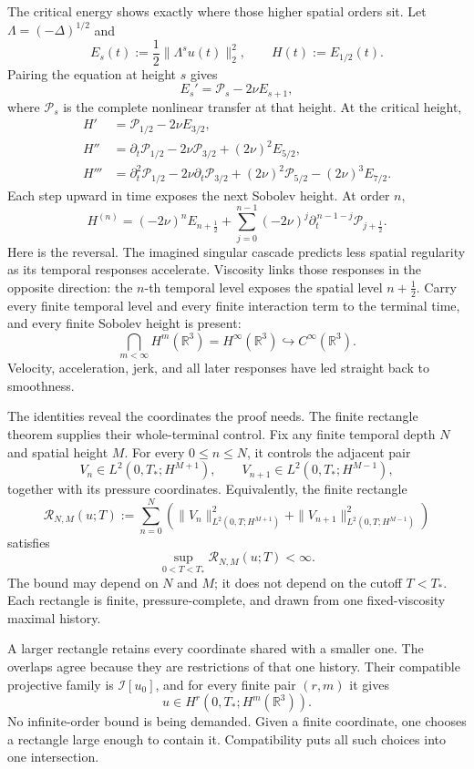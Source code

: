 \documentclass[12pt]{article}
\newcommand{\R}{\mathbb R}
\newcommand{\I}{\mathcal I}
\newcommand{\cR}{\mathcal R}
\begin{document}
The critical energy shows exactly where those higher spatial orders sit. Let
\(\Lambda=(-\Delta)^{1/2}\) and
\[
  E_s(t):=\frac12\|\Lambda^su(t)\|_2^2,
  \qquad
  H(t):=E_{1/2}(t).
\]
Pairing the equation at height \(s\) gives
\[
  E_s'=\mathcal P_s-2\nu E_{s+1},
\]
where \(\mathcal P_s\) is the complete nonlinear transfer at that height. At
the critical height,
\[
\begin{aligned}
  H'
  &=\mathcal P_{1/2}-2\nu E_{3/2},\\
  H''
  &=\partial_t\mathcal P_{1/2}
    -2\nu\mathcal P_{3/2}
    +(2\nu)^2E_{5/2},\\
  H'''
  &=\partial_t^2\mathcal P_{1/2}
    -2\nu\partial_t\mathcal P_{3/2}
    +(2\nu)^2\mathcal P_{5/2}
    -(2\nu)^3E_{7/2}.
\end{aligned}
\]
Each step upward in time exposes the next Sobolev height. At order \(n\),
\[
  H^{(n)}
  =
  (-2\nu)^nE_{n+\frac12}
  {}+
  \sum_{j=0}^{n-1}
  (-2\nu)^j
  \partial_t^{\,n-1-j}\mathcal P_{j+\frac12}.
\]
\newpage
Here is the reversal. The imagined singular cascade predicts less spatial
regularity as its temporal responses accelerate. Viscosity links those
responses in the opposite direction: the \(n\)-th temporal level exposes the
spatial level \(n+\tfrac12\). Carry every finite temporal level and every
finite interaction term to the terminal time, and every finite Sobolev height
is present:
\[
  \bigcap_{m<\infty}H^m(\R^3)
  =
  H^\infty(\R^3)
  \hookrightarrow
  C^\infty(\R^3).
\]
Velocity, acceleration, jerk, and all later responses have led straight back
to smoothness.

The identities reveal the coordinates the proof needs. The finite rectangle
theorem supplies their whole-terminal control. Fix any finite temporal depth
\(N\) and spatial height \(M\). For every \(0\leq n\leq N\), it controls the
adjacent pair
\[
  V_n\in L^2(0,T_*;H^{M+1}),
  \qquad
  V_{n+1}\in L^2(0,T_*;H^{M-1}),
\]
together with its pressure coordinates. Equivalently, the finite rectangle
\[
  \cR_{N,M}(u;T)
  :=
  \sum_{n=0}^{N}
  \left(
    \|V_n\|_{L^2(0,T;H^{M+1})}^2
    {}+
    \|V_{n+1}\|_{L^2(0,T;H^{M-1})}^2
  \right)
\]
satisfies
\[
  \sup_{0<T<T_*}\cR_{N,M}(u;T)<\infty.
\]
The bound may depend on \(N\) and \(M\); it does not depend on the cutoff
\(T<T_*\). Each rectangle is finite, pressure-complete, and drawn from one
fixed-viscosity maximal history.

A larger rectangle retains every coordinate shared with a smaller one. The
overlaps agree because they are restrictions of that one history. Their
compatible projective family is \(\I[u_0]\), and for every finite pair
\((r,m)\) it gives
\[
  u\in H^r(0,T_*;H^m(\R^3)).
\]
No infinite-order bound is being demanded. Given a finite coordinate, one
chooses a rectangle large enough to contain it. Compatibility puts all such
choices into one intersection.
\end{document}
